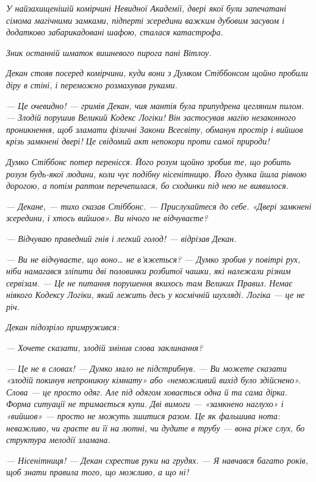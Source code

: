 \documentclass[12pt, a4paper, openany]{book}
\begin{document}
\begin{terrybox}
\textit{У найзахищенішій комірчині Невидної Академії, двері якої були запечатані сімома магічними замками, підперті зсередини важким дубовим засувом і додатково забарикадовані шафою, сталася катастрофа.}

\textit{Зник останній шматок вишневого пирога пані Вітлоу.}

\textit{Декан стояв посеред комірчини, куди вони з Думком Стіббонсом щойно пробили діру в стіні, і переможно розмахував руками.}

\textit{--- Це очевидно! --- гримів Декан, чия мантія була припудрена цегляним пилом. --- Злодій порушив Великий Кодекс Логіки! Він застосував магію незаконного проникнення, щоб зламати фізичні Закони Всесвіту, обманув простір і вийшов крізь замкнені двері! Це свідомий акт непокори проти самої природи!}

\textit{Думко Стіббонс потер перенісся. Його розум щойно зробив те, що робить розум будь-якої людини, коли чує подібну нісенітницю. Його думка йшла рівною дорогою, а потім раптом перечепилася, бо сходинки під нею не виявилося.}

\textit{--- Декане, --- тихо сказав Стіббонс. --- Прислухайтеся до себе. «Двері замкнені зсередини, і хтось вийшов». Ви нічого не відчуваєте?}

\textit{--- Відчуваю праведний гнів і легкий голод! --- відрізав Декан.}

\textit{--- Ви не відчуваєте, що воно\ldots{} не в'яжеться? --- Думко зробив у повітрі рух, ніби намагався зліпити дві половинки розбитої чашки, які належали різним сервізам. --- Це не питання порушення якихось там Великих Правил. Немає ніякого Кодексу Логіки, який лежить десь у космічній шухляді. Логіка --- це не річ.}

\textit{Декан підозріло примружився:}

\textit{--- Хочете сказати, злодій змінив слова заклинання?}

\textit{--- Це не в словах! --- Думко мало не підстрибнув. --- Ви можете сказати «злодій покинув непроникну кімнату» або «неможливий вихід було здійснено». Слова --- це просто одяг. Але під одягом ховається одна й та сама дірка. Форма ситуації не тримається купи. Дві вимоги --- «замкнено наглухо» і «вийшов» --- просто не можуть зшитися разом. Це як фальшива нота: неважливо, чи граєте ви її на лютні, чи дудите в трубу --- вона ріже слух, бо структура мелодії зламана.}

\textit{--- Нісенітниця! --- Декан схрестив руки на грудях. --- Я навчався багато років, щоб знати правила того, що можливо, а що ні!}


\end{terrybox}
\end{document}
